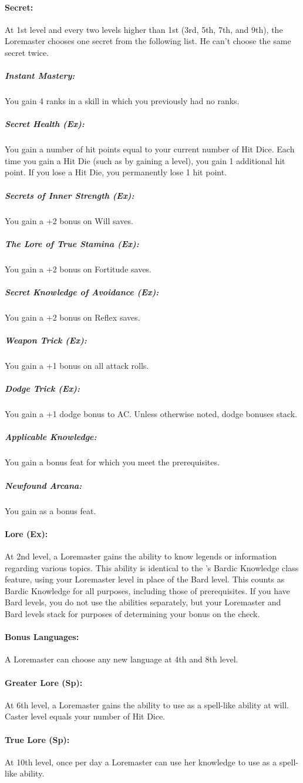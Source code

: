 \paragraph{Secret:}
At 1st level and every two levels higher than 1st (3rd, 5th, 7th, and 9th), the Loremaster chooses one secret from the following list.
He can't choose the same secret twice.

\subparagraph{Instant Mastery:}
You gain 4 ranks in a skill in which you previously had no ranks.\\
\subparagraph{Secret Health (Ex):}
You gain a number of hit points equal to your current number of Hit Dice. 
Each time you gain a Hit Die (such as by gaining a level), you gain 1 additional hit point. 
If you lose a Hit Die, you permanently lose 1 hit point.
\subparagraph{Secrets of Inner Strength (Ex):}
You gain a +2 bonus on Will saves.
\subparagraph{The Lore of True Stamina (Ex):}
You gain a +2 bonus on Fortitude saves.
\subparagraph{Secret Knowledge of Avoidance (Ex):}
You gain a +2 bonus on Reflex saves.
\subparagraph{Weapon Trick (Ex):}
You gain a +1 bonus on all attack rolls.
\subparagraph{Dodge Trick (Ex):}
You gain a +1 dodge bonus to AC. Unless otherwise noted, dodge bonuses stack.
\subparagraph{Applicable Knowledge:}
You gain a bonus feat for which you meet the prerequisites.
\subparagraph{Newfound Arcana:}
You gain  as a bonus feat.

\paragraph{Lore (Ex):}
At 2nd level, a Loremaster gains the ability to know legends or information regarding various topics. This ability is identical to the 's Bardic Knowledge class feature, using your Loremaster level in place of the Bard level. This counts as Bardic Knowledge for all purposes, including those of prerequisites. If you have Bard levels, you do not use the abilities separately, but your Loremaster and Bard levels stack for purposes of determining your bonus on the check.

\paragraph{Bonus Languages:}
A Loremaster can choose any new language at 4th and 8th level.

\paragraph{Greater Lore (Sp):}
At 6th level, a Loremaster gains the ability to use  as a spell-like ability at will.
Caster level equals your number of Hit Dice.

\paragraph{True Lore (Sp):}
At 10th level, once per day a Loremaster can use her knowledge to use  as a spell-like ability.